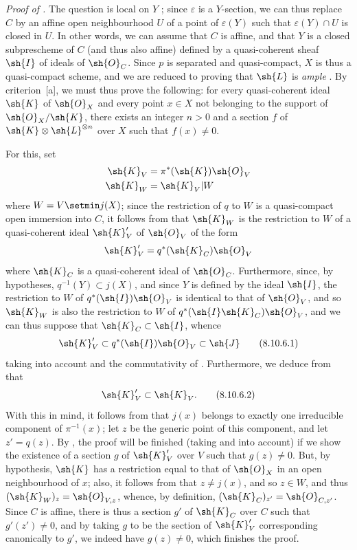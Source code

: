 \begin{env}[8.10.6]
\label{II.8.10.6}
\emph{Proof of .}
The question is local on $Y$ ;
since $\varepsilon$ is a $Y$-section, we can thus replace $C$ by an affine open neighbourhood $U$ of a point of $\varepsilon(Y)$ such that $\varepsilon(Y)\cap U$ is closed in $U$.
In other words, we can assume that $C$ is affine, and that $Y$ is a closed subprescheme of $C$ (and thus also affine) defined by a quasi-coherent sheaf
$\sh{I}$ of ideals of $\sh{O}_C$.
Since $p$ is separated and quasi-compact, $X$ is thus a quasi-compact scheme, and we are reduced to proving that $\sh{L}$ is \emph{ample} .
By criterion~[a], we must thus prove the following:
for every quasi-coherent ideal $\sh{K}$ of $\sh{O}_X$ and every point $x\in X$ not belonging to the support of $\sh{O}_X/\sh{K}$, there exists an integer $n>0$ and a section $f$ of $\sh{K}\otimes\sh{L}^{\otimes n}$ over $X$ such that $f(x)\neq0$.

For this, set
\begin{align*}
  \sh{K}_V &= \pi^*(\sh{K})\sh{O}_V\\
  \sh{K}_W &= \sh{K}_V|W
\end{align*}
where $W=V\setmin j(X)$;
since the restriction of $q$ to $W$ is a quasi-compact open immersion into $C$, it follows from  that $\sh{K}_W$ is the restriction to $W$ of a quasi-coherent ideal $\sh{K}'_V$ of $\sh{O}_V$ of the form
\[
    \sh{K}'_V = q^*(\sh{K}_C)\sh{O}_V
\]
where $\sh{K}_C$ is a quasi-coherent ideal of $\sh{O}_C$.
Furthermore, since, by hypotheses, $q^{-1}(Y)\subset j(X)$, and since $Y$ is defined by the ideal $\sh{I}$, the restriction to $W$ of $q^*(\sh{I})\sh{O}_V$ is identical to that of $\sh{O}_V$, and so $\sh{K}_W$ is also the restriction to $W$ of $q^*(\sh{I}\sh{K}_C)\sh{O}_V$, and we can thus suppose that $\sh{K}_C\subset\sh{I}$, whence
\[
\label{II.8.10.6.1}
    \sh{K}'_V \subset q^*(\sh{I})\sh{O}_V \subset \sh{J}
\tag{8.10.6.1}
\]
taking into account  and the commutativity of .
Furthermore, we deduce from  that
\[
\label{II.8.10.6.2}
    \sh{K}'_V \subset \sh{K}_V.
\tag{8.10.6.2}
\]
With this in mind, it follows from  that $j(x)$ belongs to exactly one irreducible component of $\pi^{-1}(x)$;
let $z$ be the generic point of this component, and let $z'=q(z)$.
By , the proof will be finished (taking  and  into account) if we show the existence of a section $g$ of $\sh{K}'_V$ over $V$ such that $g(z)\neq0$.
But, by hypothesis, $\sh{K}$ has a restriction equal to that of $\sh{O}_X$ in an open neighbourhood of $x$;
also, it follows from  that $z\neq j(x)$, and so $z\in W$, and thus $(\sh{K}_W)_z=\sh{O}_{V,z}$, whence, by definition, $(\sh{K}_C)_{z'}=\sh{O}_{C,z'}$.
Since $C$ is affine, there is thus a section $g'$ of $\sh{K}_C$ over $C$ such that $g'(z')\neq0$, and by taking $g$ to be the section of $\sh{K}'_V$ corresponding canonically to $g'$, we indeed have $g(z)\neq0$, which finishes the proof.
\end{env}


